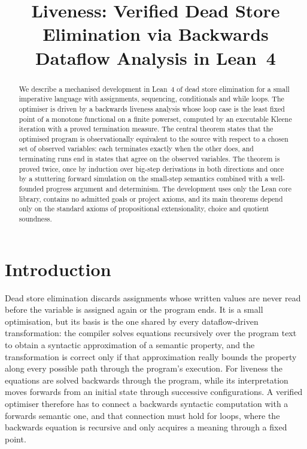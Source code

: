 \documentclass[11pt,a4paper]{article}
\title{Liveness: Verified Dead Store Elimination via Backwards Dataflow Analysis in Lean~4}
\author{}
\date{}
\theoremstyle{plain}
\theoremstyle{definition}
\theoremstyle{remark}
\begin{document}
\maketitle

\begin{abstract}
We describe a mechanised development in Lean~4 of dead store elimination for a small imperative language with assignments, sequencing, conditionals and while loops. The optimiser is driven by a backwards liveness analysis whose loop case is the least fixed point of a monotone functional on a finite powerset, computed by an executable Kleene iteration with a proved termination measure. The central theorem states that the optimised program is observationally equivalent to the source with respect to a chosen set of observed variables: each terminates exactly when the other does, and terminating runs end in states that agree on the observed variables. The theorem is proved twice, once by induction over big-step derivations in both directions and once by a stuttering forward simulation on the small-step semantics combined with a well-founded progress argument and determinism. The development uses only the Lean core library, contains no admitted goals or project axioms, and its main theorems depend only on the standard axioms of propositional extensionality, choice and quotient soundness.
\end{abstract}

\section{Introduction}

Dead store elimination discards assignments whose written values are never read before the variable is assigned again or the program ends. It is a small optimisation, but its basis is the one shared by every dataflow-driven transformation: the compiler solves equations recursively over the program text to obtain a syntactic approximation of a semantic property, and the transformation is correct only if that approximation really bounds the property along every possible path through the program's execution. For liveness the equations are solved backwards through the program, while its interpretation moves forwards from an initial state through successive configurations. A verified optimiser therefore has to connect a backwards syntactic computation with a forwards semantic one, and that connection must hold for loops, where the backwards equation is recursive and only acquires a meaning through a fixed point.
\end{document}
